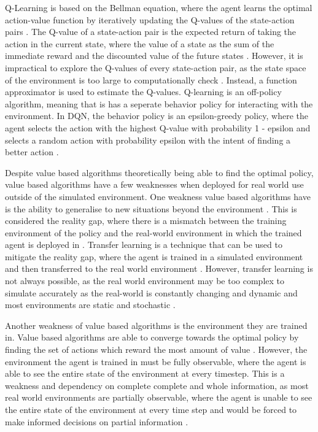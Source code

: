 Q-Learning is based on the Bellman equation, where the agent learns the optimal action-value function by iteratively updating the Q-values of the state-action pairs \cite{mnih2013playing}. The Q-value of a state-action pair is the expected return of taking the action in the current state, where the value of a state as the sum of the immediate reward and the discounted value of the future states \cite{bellman1958dynamic}.  However, it is impractical to explore the Q-values of every state-action pair, as the state space of the environment is too large to computationally check \cite{mnih2013playing}. Instead, a function approximator is used to estimate the Q-values. Q-learning is an off-policy algorithm, meaning that is has a seperate behavior policy for interacting with the environment. In DQN, the behavior policy is an epsilon-greedy policy, where the agent selects the action with the highest Q-value with probability 1 - epsilon and selects a random action with probability epsilon with the intent of finding a better action \cite{TFAgentsAuthors2023}.

Despite value based algorithms theoretically being able to find the optimal policy, value based algorithms have a few weaknesses when deployed for real world use outside of the simulated environment. One weakness value based algorithms have is the ability to generalise to new situations beyond the environment \cite{OdelTruxillo2023}. This is considered the reality gap, where there is a mismatch between the training environment of the policy and the real-world environment in which the trained agent is deployed in \cite{tobin2017domain}. Transfer learning is a technique that can be used to mitigate the reality gap, where the agent is trained in a simulated environment and then transferred to the real world environment \cite{OdelTruxillo2023}. However, transfer learning is not always possible, as the real world environment may be too complex to simulate accurately as the real-world is constantly changing and dynamic and most environments are static and stochastic \cite{OdelTruxillo2023}. 

Another weakness of value based algorithms is the environment they are trained in. Value based algorithms are able to converge towards the optimal policy by finding the set of actions which reward the most amount of value \cite{OdelTruxillo2023}. However, the environment the agent is trained in must be fully observable, where the agent is able to see the entire state of the environment at every timestep. This is a weakness and dependency on complete complete and whole information, as most real world environments are partially observable, where the agent is unable to see the entire state of the environment at every time step and would be forced to make informed decisions on partial information \cite{dulac2021challenges}. 

